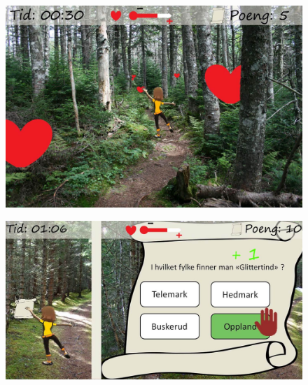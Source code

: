 \begin{figure} [H]
\centering
\includegraphics[scale=0.3]{hjerter.jpg}
\label{fig:heartsNorsk}
\end{figure}

\begin{figure} [H]
\centering
\includegraphics[scale=0.3]{quiz.jpg}
\label{fig:quizapp}
\end{figure} 

